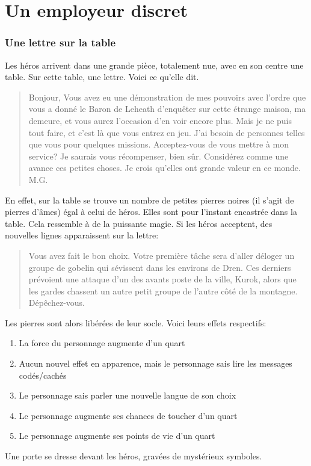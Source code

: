 \documentclass[a4paper]{article}
\begin{document}
\part{Un employeur discret}
\section{Une lettre sur la table}
Les héros arrivent dans une grande pièce, totalement nue, avec en son centre une table. Sur cette table, une lettre. Voici ce qu'elle dit.
\begin{quotation}
Bonjour,
\newline
Vous avez eu une démonstration de mes pouvoirs avec l'ordre que vous a donné le Baron de Leheath d’enquêter sur cette étrange maison, ma demeure, et vous aurez l'occasion d'en voir encore plus. Mais je ne puis tout faire, et c'est là que vous entrez en jeu. J'ai besoin de personnes telles que vous pour quelques missions. Acceptez-vous de vous mettre à mon service?
\newline
Je saurais vous récompenser, bien sûr. Considérez comme une avance ces petites choses. Je crois qu'elles ont grande valeur en ce monde.
\newline
M.G.
\end{quotation}
En effet, sur la table se trouve un nombre de petites pierres noires (il s'agit de pierres d'âmes) égal à celui de héros. Elles sont pour l'instant encastrée dans la table. Cela ressemble à de la puissante magie. Si les héros acceptent, des nouvelles lignes apparaissent sur la lettre:
\begin{quotation}
Vous  avez fait le bon choix. Votre première tâche sera d'aller déloger un groupe de gobelin qui sévissent dans les environs de Dren. Ces derniers prévoient une attaque d'un des avants poste de la ville, Kurok, alors que les gardes chassent un autre petit groupe de l'autre côté de la montagne. Dépêchez-vous.
\end{quotation}
Les pierres sont alors libérées de leur socle. Voici leurs effets respectifs:
\begin{enumerate}
\item La force du personnage augmente d'un quart
\item Aucun nouvel effet en apparence, mais le personnage sais lire les messages codés/cachés
\item Le personnage sais parler une nouvelle langue de son choix
\item Le personnage augmente ses chances de toucher d'un quart
\item Le personnage augmente ses points de vie d'un quart
\end{enumerate}
Une porte se dresse devant les héros, gravées de mystérieux symboles.
\end{document}
